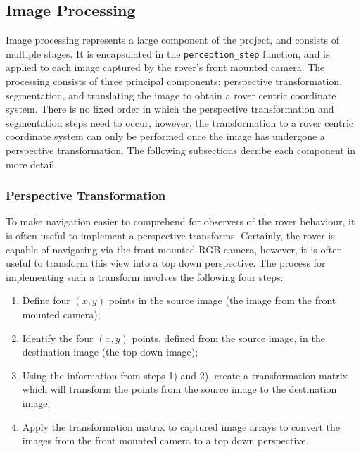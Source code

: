 \documentclass[a4paper]{article}
\begin{document}
\subsection{Image Processing}
Image processing represents a large component of the project, and consists of multiple stages. It is encapsulated in the \verb|perception_step| function, and is applied to each image captured by the rover's front mounted camera. The processing consists of three principal components: perspective transformation, segmentation, and translating the image to obtain a rover centric coordinate system. There is no fixed order in which the perspective transformation and segmentation steps need to occur, however, the transformation to a rover centric coordinate system can only be performed once the image has undergone a perspective transformation. The following subsections decribe each component in more detail.

\subsubsection{Perspective Transformation}
To make navigation easier to comprehend for observers of the rover behaviour, it is often useful to implement a perspective transforms. Certainly, the rover is capable of navigating via the front mounted RGB camera, however, it is often useful to transform this view into a top down perspective. The process for implementing such a transform involves the following four steps:
\begin{enumerate}
\item Define four $(x,y)$ points in the source image (the image from the front mounted camera);
\item Identify the four $(x,y)$ points, defined from the source image, in the destination image (the top down image);
\item Using the information from steps 1) and 2), create a transformation matrix which will transform the points from the source image to the destination image;
\item Apply the transformation matrix to captured image arrays to convert the images from the front mounted camera to a top down perspective.
\end{enumerate}  
\end{document}

